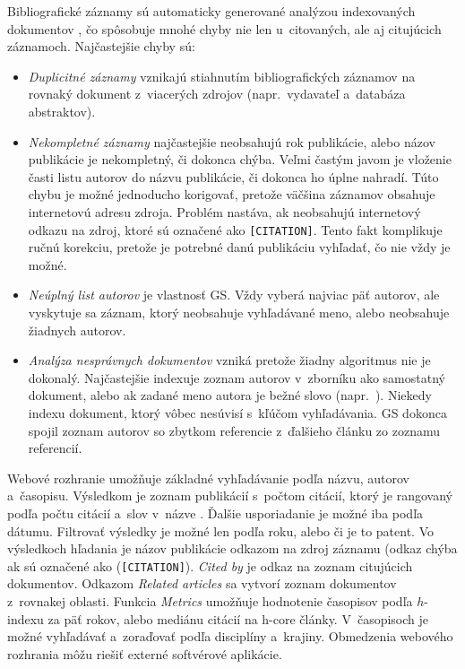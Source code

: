Bibliografické záznamy sú automaticky generované analýzou indexovaných
dokumentov \citep{Vine2006}, čo spôsobuje mnohé chyby nie len u~citovaných, ale
aj citujúcich záznamoch.  Najčastejšie chyby sú:
\begin{itemize}
\item \emph{Duplicitné záznamy} vznikajú stiahnutím bibliografických záznamov na
  rovnaký dokument z~viacerých zdrojov (napr.~vydavateľ a~databáza abstraktov).
\item \emph{Nekompletné záznamy} najčastejšie neobsahujú rok publikácie, alebo
  názov publikácie je nekompletný, či dokonca chýba.  Veľmi častým javom je
  vloženie časti listu autorov do názvu publikácie, či dokonca ho úplne nahradí.
  Túto chybu je možné jednoducho korigovať, pretože väčšina záznamov obsahuje
  internetovú adresu zdroja.  Problém nastáva, ak neobsahujú internetový odkazu
  na zdroj, ktoré sú označené ako \texttt{[CITATION]}.  Tento fakt komplikuje
  ručnú korekciu, pretože je potrebné danú publikáciu vyhľadať, čo nie vždy je
  možné.
\item \emph{Neúplný list autorov} je vlastnosť GS.  Vždy vyberá najviac päť autorov,
  ale vyskytuje sa záznam, ktorý neobsahuje vyhľadávané meno, alebo neobsahuje
  žiadnych autorov.
\item \emph{Analýza nesprávnych dokumentov} vzniká pretože žiadny algoritmus nie
  je dokonalý.  Najčastejšie indexuje zoznam autorov v~zborníku ako samostatný
  dokument, alebo ak zadané meno autora je bežné slovo (napr.~).  Niekedy
  indexu dokument, ktorý vôbec nesúvisí s~kľúčom vyhľadávania.  GS dokonca
  spojil zoznam autorov so zbytkom referencie z~ďalšieho článku zo zoznamu
  referencií.
\end{itemize}

\noindent Webové rozhranie umožňuje základné vyhľadávanie podľa názvu, autorov
a~časopisu.  Výsledkom je zoznam publikácií s~počtom citácií, ktorý je rangovaný
podľa počtu citácií a~slov v~názve \citep{Beel2009}.  Ďalšie usporiadanie je
možné iba podľa dátumu.  Filtrovať výsledky je možné len podľa roku, alebo či je
to patent.  Vo výsledkoch hľadania je názov publikácie odkazom na zdroj záznamu
(odkaz chýba ak sú označené ako (\texttt{[CITATION]}).  \emph{Cited by} je odkaz
na zoznam citujúcich dokumentov.  Odkazom \emph{Related articles} sa vytvorí
zoznam dokumentov z~rovnakej oblasti.  Funkcia \emph{Metrics} umožňuje
hodnotenie časopisov podľa $h$-indexu za päť rokov, alebo mediánu citácií na
h-core články.  V~časopisoch je možné vyhľadávať a~zoraďovať podľa disciplíny
a~krajiny.  Obmedzenia webového rozhrania môžu riešiť externé softvérové
aplikácie.

